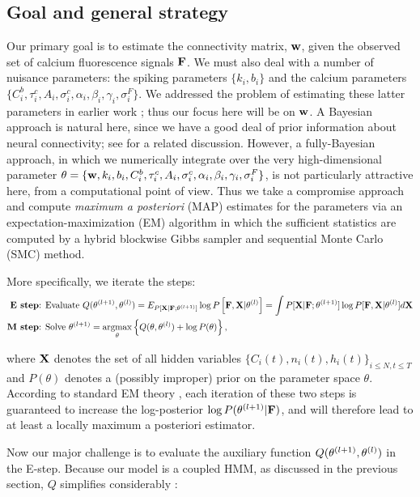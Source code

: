 \subsection{Goal and general strategy}  \label{sec:methods:goal}

Our primary goal is to estimate the connectivity matrix, $\mathbf{w}$, given the observed set of calcium fluorescence signals ${\bf F}$. We must also deal with a number of nuisance parameters: the spiking parameters $\{k_i, b_i\}$ and the calcium parameters $\{C^b_i, \tau^c_i, A_i, \sigma^c_i, \alpha_i, \beta_i, \gamma_i, \sigma^F_i\}$. We addressed the problem of estimating these latter parameters in earlier work \cite{Vogelstein2009}; thus our focus here will be on $\mathbf{w}$. A Bayesian approach is natural here, since we have a good deal of prior information about neural connectivity; see \cite{Rigat06} for a related discussion. However, a fully-Bayesian approach, in which we numerically integrate over the very high-dimensional parameter $\theta = \{\mathbf{w}, k_i, b_i, C^b_i, \tau^c_i, A_i, \sigma^c_i, \alpha_i, \beta_i, \gamma_i, \sigma^F_i\}$, is not particularly attractive here, from a computational point of view. Thus we take a compromise approach and compute \emph{maximum a posteriori} (MAP) estimates for the parameters via an expectation-maximization (EM) algorithm in which the sufficient statistics are computed by a hybrid blockwise Gibbs sampler and sequential Monte Carlo (SMC) method.

More specifically, we iterate the steps:
\begin{align*}
\textbf{E step} &\text{: Evaluate } Q(\bth^{(l+1)},\bth^{(l)}) =
E_{P[\bX | \bF; \bth^{(l+1)}]} \log P \left[ \bF, \bX | \bth^{(l)}
\right] = \int P[\bX | \bF; \bth^{(l+1)}] \log P[\bF, \bX | \bth^{(l)}]
d \bX \\ \textbf{M step} &\text{: Solve } \bth^{(l+1)} =
\argmax_{\bth} \left\{ Q(\bth,\bth^{(l)}) + \log P(\theta) \right\},
\end{align*}

where ${\bf X}$ denotes the set of all hidden variables $\{ C_i(t), n_i(t), h_i(t) \}_{i \leq N, t \leq T}$ and $P(\theta)$ denotes a (possibly improper) prior on the parameter space $\theta$. According to standard EM theory \cite{DLR77,McLachlanKrishnan96}, each iteration of these two steps is guaranteed to increase the log-posterior $\log P(\mathbf{\theta}^{(l+1)} | {\bf F})$, and will therefore lead to at least a locally maximum a posteriori estimator.

Now our major challenge is to evaluate the auxiliary function $Q(\mathbf{\theta}^{(l+1)},\mathbf{\theta}^{(l)})$ in the E-step. Because our model is a coupled HMM, as discussed in the previous section, $Q$ simplifies considerably \cite{RAB89}:

